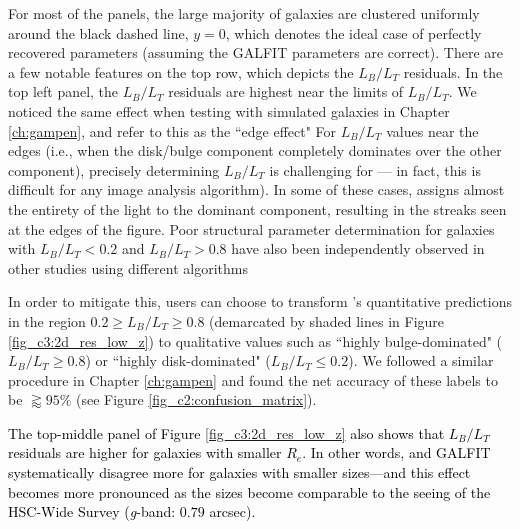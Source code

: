 For most of the panels, the large majority of galaxies are clustered uniformly around the black dashed line, $y = 0$, which denotes the ideal case of perfectly recovered parameters (assuming the GALFIT parameters are correct). There are a few notable features on the top row, which depicts the $L_B/L_T$ residuals.  In the top left panel, the $L_B/L_T$ residuals are highest near the limits of $L_B/L_T$. We noticed the same effect when testing \gampen{} with simulated galaxies in Chapter \ref{ch:gampen}, and refer to this as the ``edge effect" 
For $L_B/L_T$ values near the edges (i.e., when the disk/bulge component completely dominates over the other component), precisely determining $L_B/L_T$ is challenging for \gampen{} --- in fact, this is difficult for any image analysis algorithm). In some of these cases, \gampen{} assigns almost the entirety of the light to the dominant component, resulting in the streaks seen at the edges of the figure. Poor structural parameter determination for galaxies with $L_B/L_T < 0.2$ and $L_B/L_T>0.8$ have also been independently observed in other studies using different algorithms \citep[e.g.,][]{euclid_morph, galapagos}


In order to mitigate this, \gampen{} users can choose to transform \gampen{}'s quantitative predictions in the region $0.2 \geq L_B/L_T \geq 0.8$ (demarcated by shaded lines in Figure \ref{fig_c3:2d_res_low_z}) to qualitative values such as ``highly bulge-dominated" ($L_B/L_T \geq 0.8$) or ``highly disk-dominated" ($L_B/L_T \leq 0.2$). We followed a similar procedure in Chapter \ref{ch:gampen} and found the net accuracy of these labels to be $\gtrapprox95\%$ (see Figure \ref{fig_c2:confusion_matrix}).

\textcolor{black}{The top-middle panel of Figure \ref{fig_c3:2d_res_low_z} also shows that $L_B/L_T$ residuals are higher for galaxies with smaller $R_e$. In other words, \gampen{} and GALFIT systematically disagree more for galaxies with smaller sizes---and this effect becomes more pronounced as the sizes become comparable to the seeing of the HSC-Wide Survey (\textit{g}-band: $0.79$ arcsec).} 

